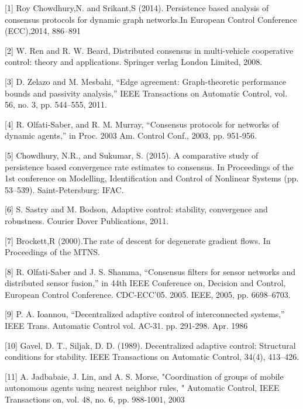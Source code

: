 \documentclass[journal]{IEEEtran}
\begin{document}
[1] Roy Chowdhury,N. and Srikant,S (2014). Persistence based analysis of consensus protocols for dynamic graph networks.In European Control Conference (ECC),2014, 886–891 \break
 
[2] W. Ren and R. W. Beard, Distributed consensus in multi-vehicle cooperative control: theory and applications. Springer verlag London Limited, 2008. \break

[3] D. Zelazo and M. Mesbahi, “Edge agreement: Graph-theoretic performance bounds and passivity analysis,” IEEE Transactions on Automatic Control, vol. 56, no. 3, pp. 544–555, 2011. \break

[4] R. Olfati-Saber, and R. M. Murray, “Consensus protocols for networks of dynamic agents,” in Proc. 2003 Am. Control Conf., 2003, pp. 951-956.\break

[5] Chowdhury, N.R., and Sukumar, S. (2015). A comparative study of persistence based convergence rate estimates to consensus. In Proceedings of the 1st conference on Modelling, Identification and Control of Nonlinear Systems (pp. 53–539). Saint-Petersburg: IFAC. \break

[6] S. Sastry and M. Bodson, Adaptive control: stability, convergence
and robustness. Courier Dover Publications, 2011. \break

[7] Brockett,R (2000).The rate of descent for degenerate gradient flows. In Proceedings of the MTNS. \break

[8] R. Olfati-Saber and J. S. Shamma, “Consensus filters for
sensor networks and distributed sensor fusion,” in 44th IEEE
Conference on, Decision and Control, European Control Conference.
CDC-ECC’05. 2005. IEEE, 2005, pp. 6698–6703. \break

[9] P. A. Ioannou, “Decentralized adaptive control of interconnected
systems,” IEEE Trans. Automatic Control vol. AC-31. pp. 291-298.
Apr. 1986 \break

[10] Gavel, D. T.,  Siljak, D. D. (1989). Decentralized adaptive control: Structural conditions for stability. IEEE Transactions on Automatic Control, 34(4), 413–426. \break

[11] A. Jadbabaie, J. Lin, and A. S. Morse, "Coordination of groups of mobile autonomous agents using nearest neighbor rules, " Automatic Control, IEEE Transactions on, vol. 48, no. 6, pp. 988-1001, 2003 \break



\end{document}
